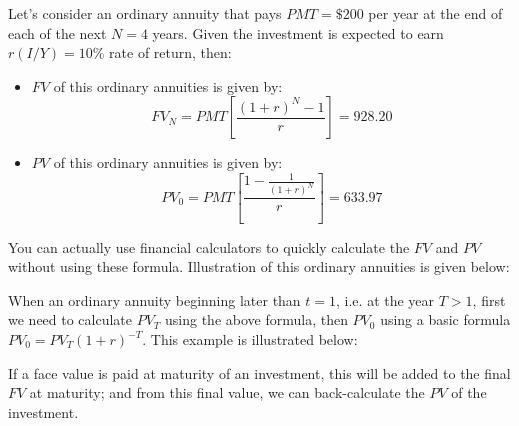 Let's consider an ordinary annuity that pays $PMT = \$200$ per year at the end of each of the next $N = 4$ years. Given the investment is expected to earn $r (I/Y) = 10\%$ rate of return, then:
\begin{itemize}
	\setlength\itemsep{0em}
	\item $FV$ of this ordinary annuities is given by:
	\begin{equation}
		FV_N = PMT \left[ \frac{(1+r)^N - 1}{r} \right] = 928.20
	\end{equation}
	\item $PV$ of this ordinary annuities is given by:
	\begin{equation}
		PV_0 = PMT \left[ \frac{1 - \frac{1}{(1+r)^N}}{r} \right] = 633.97
	\end{equation}	
\end{itemize}
You can actually use financial calculators to quickly calculate the $FV$ and $PV$ without using these formula. Illustration of this ordinary annuities is given below:
\newcommand{\timc}{{"0","1","2","3","4"}}
\newcommand{\tvmc}{{"","+200","+200","+200","+200"}}
\begin{center}
\end{center}
When an ordinary annuity beginning later than $t = 1$, i.e. at the year $T > 1$, first we need to calculate $PV_T$ using the above formula, then $PV_0$ using a basic formula $PV_0 = PV_T (1+r)^{-T}$. This example is illustrated below:
\newcommand{\timd}{{"0","1","2","3","4","5","6"}}
\newcommand{\tvmd}{{"","","","+100","+100","+100","+100"}}
\begin{center}
\end{center}
If a face value is paid at maturity of an investment, this will be added to the final $FV$ at maturity; and from this final value, we can back-calculate the $PV$ of the investment. 

